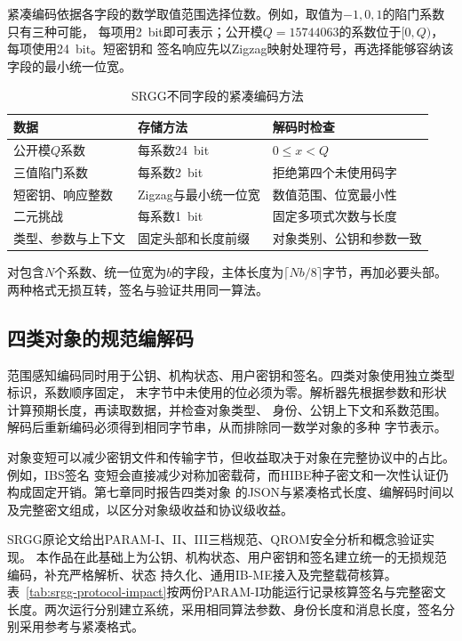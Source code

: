 紧凑编码依据各字段的数学取值范围选择位数。例如，取值为$-1,0,1$的陷门系数只有三种可能，
每项用2~bit即可表示；公开模$Q=15744063$的系数位于$[0,Q)$，每项使用24~bit。短密钥和
签名响应先以Zigzag映射处理符号，再选择能够容纳该字段的最小统一位宽。

\begin{table}[H]
\centering\small
\caption{SRGG不同字段的紧凑编码方法}
\label{tab:codec-fields}
\begin{tabularx}{\textwidth}{@{}p{}p{}X@{}}
\toprule
\rowcolor{black!8} 数据 & 存储方法 & 解码时检查 \\
\midrule
公开模$Q$系数 & 每系数24~bit & $0\leq x<Q$ \\
三值陷门系数 & 每系数2~bit & 拒绝第四个未使用码字 \\
短密钥、响应整数 & Zigzag与最小统一位宽 & 数值范围、位宽最小性 \\
二元挑战 & 每系数1~bit & 固定多项式次数与长度 \\
类型、参数与上下文 & 固定头部和长度前缀 & 对象类别、公钥和参数一致 \\
\bottomrule
\end{tabularx}
\end{table}

对包含$N$个系数、统一位宽为$b$的字段，主体长度为$\lceil Nb/8\rceil$字节，再加必要头部。
两种格式无损互转，签名与验证共用同一算法。

\subsection{四类对象的规范编解码}

范围感知编码同时用于公钥、机构状态、用户密钥和签名。四类对象使用独立类型标识，系数顺序固定，
末字节中未使用的位必须为零。解析器先根据参数和形状计算预期长度，再读取数据，并检查对象类型、
身份、公钥上下文和系数范围。解码后重新编码必须得到相同字节串，从而排除同一数学对象的多种
字节表示。

对象变短可以减少密钥文件和传输字节，但收益取决于对象在完整协议中的占比。例如，IBS签名
变短会直接减少对称加密载荷，而HIBE种子密文和一次性认证仍构成固定开销。第七章同时报告四类对象
的JSON与紧凑格式长度、编解码时间以及完整密文组成，以区分对象级收益和协议级收益。

SRGG原论文给出PARAM-I、II、III三档规范、QROM安全分析和概念验证实现\cite{jia2025ibs}。
本作品在此基础上为公钥、机构状态、用户密钥和签名建立统一的无损规范编码，补充严格解析、状态
持久化、通用IB-ME接入及完整载荷核算。表~\ref{tab:srgg-protocol-impact}按两份PARAM-I功能运行记录核算签名与完整密文长度。两次运行分别建立系统，采用相同算法参数、身份长度和消息长度，签名分别采用参考与紧凑格式。

